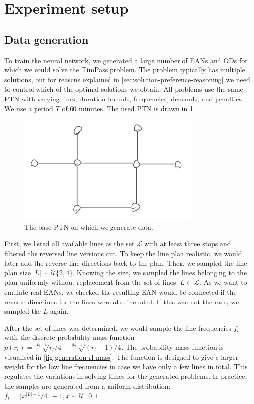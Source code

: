 \documentclass[english, 12pt, a4paper, sci, utf8, a-2b, online]{aaltothesis}
\newcommand{\unif}[1]{\mathcal{U}\{#1\}}
\newcommand{\unifcont}[1]{\mathcal{U}[#1]}
\begin{document}
\clearpage
\section{Experiment setup}
\subsection{Data generation}

To train the neural network, we generated a large number of EANs and ODs for which we could solve the TimPass problem. The problem typically has multiple solutions, but for reasons explained in \cref{sec:solution-preference-reasoning} we need to control which of the optimal solutions we obtain. All problems use the same PTN with varying lines, duration bounds, frequencies, demands, and penalties. We use a period $T$ of 60 minutes. The used PTN is drawn in \cref{fig:base-ptn}.


\begin{figure}
    \centering
    \includegraphics[width=0.8\textwidth]{figures/base-ptn.jpg}
    \caption{The base PTN on which we generate data.}
    \label{fig:base-ptn}
\end{figure}


First, we listed all available lines as the set $\mathcal{L}$ with at least three stops and filtered the reversed line versions out. To keep the line plan realistic, we would later add the reverse line directions back to the plan. Then, we sampled the line plan size $|L| \sim \unif{2, 4}$. Knowing the size, we sampled the lines belonging to the plan uniformly without replacement from the set of lines: $L \subset \mathcal{L}$. As we want to emulate real EANs, we checked the resulting EAN would be connected if the reverse directions for the lines were also included. If this was not the case, we sampled the $L$ again.



After the set of lines was determined, we would sample the line frequencies $f_l$ with the discrete probability mass function $p(r_l) = \sqrt[|L| - 1]{r_l / 4} - \sqrt[|L| - 1]{(r_l - 1) / 4}$. The probability mass function is visualised in \cref{fig:generation-rl-mass}. The function is designed to give a larger weight for the low line frequencies in case we have only a few lines in total. This regulates the variations in solving times for the generated problems. In practice, the samples are generated from a uniform distribution: $f_l = \lfloor x ^{|L| - 1} / 4 \rfloor + 1, x \sim \unifcont{0, 1}$.
\end{document}
